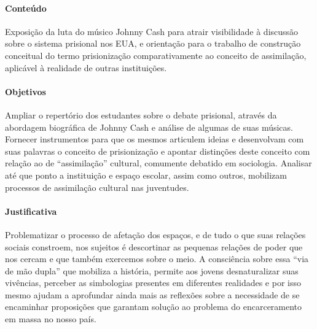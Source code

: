 \documentclass[11pt]{extarticle}
\begin{document}
\paragraph{Conteúdo} Exposição da luta do músico Johnny Cash para atrair
visibilidade à discussão sobre o sistema prisional nos EUA, e orientação
para o trabalho de construção conceitual do termo prisionização
comparativamente ao conceito de assimilação, aplicável à realidade de
outras instituições.

\paragraph{Objetivos} Ampliar o repertório dos estudantes sobre o debate
prisional, através da abordagem biográfica de Johnny Cash e análise de
algumas de suas músicas. Fornecer instrumentos para que os mesmos
articulem ideias e desenvolvam com suas palavras o conceito de
prisionização e apontar distinções deste conceito com relação ao de
``assimilação'' cultural, comumente debatido em sociologia. Analisar até
que ponto a instituição e espaço escolar, assim como outros, mobilizam
processos de assimilação cultural nas juventudes.

\paragraph{Justificativa} Problematizar o processo de afetação dos
espaços, e de tudo o que suas relações sociais constroem, nos sujeitos é
descortinar as pequenas relações de poder que nos cercam e que também
exercemos sobre o meio. A consciência sobre essa ``via de mão dupla''
que mobiliza a história, permite aos jovens desnaturalizar suas
vivências, perceber as simbologias presentes em diferentes realidades e
por isso mesmo ajudam a aprofundar ainda mais as reflexões sobre a
necessidade de se encaminhar proposições que garantam solução ao
problema do encarceramento em massa no nosso país.
\end{document}
